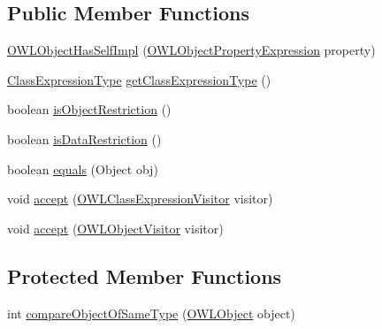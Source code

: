 \subsection*{Public Member Functions}
\begin{DoxyCompactItemize}
\item 
\hyperlink{classuk_1_1ac_1_1manchester_1_1cs_1_1owl_1_1owlapi_1_1_o_w_l_object_has_self_impl_a49a48a3101ce9e82c619da7e80689b58}{O\-W\-L\-Object\-Has\-Self\-Impl} (\hyperlink{interfaceorg_1_1semanticweb_1_1owlapi_1_1model_1_1_o_w_l_object_property_expression}{O\-W\-L\-Object\-Property\-Expression} property)
\item 
\hyperlink{enumorg_1_1semanticweb_1_1owlapi_1_1model_1_1_class_expression_type}{Class\-Expression\-Type} \hyperlink{classuk_1_1ac_1_1manchester_1_1cs_1_1owl_1_1owlapi_1_1_o_w_l_object_has_self_impl_ac5fb82de496742a23fab0e635c51a788}{get\-Class\-Expression\-Type} ()
\item 
boolean \hyperlink{classuk_1_1ac_1_1manchester_1_1cs_1_1owl_1_1owlapi_1_1_o_w_l_object_has_self_impl_a993f8873a3097814f78545ed701b9b34}{is\-Object\-Restriction} ()
\item 
boolean \hyperlink{classuk_1_1ac_1_1manchester_1_1cs_1_1owl_1_1owlapi_1_1_o_w_l_object_has_self_impl_a9395b714466b54f076a6fc54dde811e5}{is\-Data\-Restriction} ()
\item 
boolean \hyperlink{classuk_1_1ac_1_1manchester_1_1cs_1_1owl_1_1owlapi_1_1_o_w_l_object_has_self_impl_a1a037a709597c59933044b377bffb0ed}{equals} (Object obj)
\item 
void \hyperlink{classuk_1_1ac_1_1manchester_1_1cs_1_1owl_1_1owlapi_1_1_o_w_l_object_has_self_impl_ae402e8a7b0c8166b01b34d0c36165738}{accept} (\hyperlink{interfaceorg_1_1semanticweb_1_1owlapi_1_1model_1_1_o_w_l_class_expression_visitor}{O\-W\-L\-Class\-Expression\-Visitor} visitor)
\item 
void \hyperlink{classuk_1_1ac_1_1manchester_1_1cs_1_1owl_1_1owlapi_1_1_o_w_l_object_has_self_impl_abc59a6a4589d65478d45c349054dfa7d}{accept} (\hyperlink{interfaceorg_1_1semanticweb_1_1owlapi_1_1model_1_1_o_w_l_object_visitor}{O\-W\-L\-Object\-Visitor} visitor)
\end{DoxyCompactItemize}
\subsection*{Protected Member Functions}
\begin{DoxyCompactItemize}
\item 
int \hyperlink{classuk_1_1ac_1_1manchester_1_1cs_1_1owl_1_1owlapi_1_1_o_w_l_object_has_self_impl_a85f25998fdb53c0ebef8248228d6c7e2}{compare\-Object\-Of\-Same\-Type} (\hyperlink{interfaceorg_1_1semanticweb_1_1owlapi_1_1model_1_1_o_w_l_object}{O\-W\-L\-Object} object)
\end{DoxyCompactItemize}
